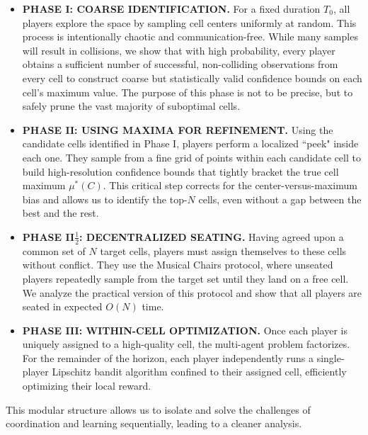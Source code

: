 \begin{itemize}
    \item \textbf{PHASE I: COARSE IDENTIFICATION.} For a fixed duration $T_0$, all players explore the space by sampling cell centers uniformly at random. This process is intentionally chaotic and communication-free. While many samples will result in collisions, we show that with high probability, every player obtains a sufficient number of successful, non-colliding observations from every cell to construct coarse but statistically valid confidence bounds on each cell's maximum value. The purpose of this phase is not to be precise, but to safely prune the vast majority of suboptimal cells.

    \item \textbf{PHASE II: USING MAXIMA FOR REFINEMENT.} Using the candidate cells identified in Phase I, players perform a localized ``peek" inside each one. They sample from a fine grid of points within each candidate cell to build high-resolution confidence bounds that tightly bracket the true cell maximum $\mu^\ast(C)$. This critical step corrects for the center-versus-maximum bias and allows us to identify the top-$N$ cells, even without a gap between the best and the rest.

    \item \textbf{PHASE II$\tfrac{1}{2}$: DECENTRALIZED SEATING.} Having agreed upon a common set of $N$ target cells, players must assign themselves to these cells without conflict. They use the Musical Chairs protocol, where unseated players repeatedly sample from the target set until they land on a free cell. We analyze the practical version of this protocol and show that all players are seated in expected $O(N)$ time.

    \item \textbf{PHASE III: WITHIN-CELL OPTIMIZATION.} Once each player is uniquely assigned to a high-quality cell, the multi-agent problem factorizes. For the remainder of the horizon, each player independently runs a single-player Lipschitz bandit algorithm confined to their assigned cell, efficiently optimizing their local reward.
\end{itemize}
This modular structure allows us to isolate and solve the challenges of coordination and learning sequentially, leading to a cleaner analysis. 


